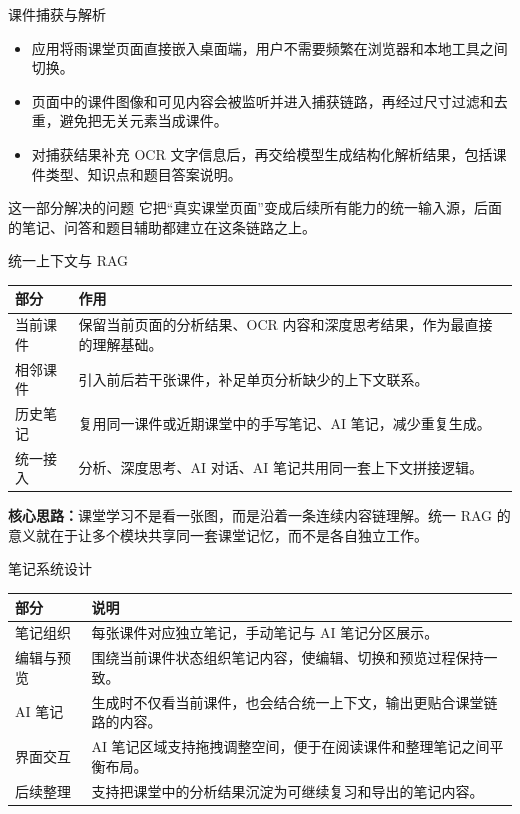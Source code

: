 \documentclass[11pt,aspectratio=169]{ctexbeamer}
\begin{document}
\begin{frame}[t]{课件捕获与解析}
\normalsize
\begin{itemize}
\item 应用将雨课堂页面直接嵌入桌面端，用户不需要频繁在浏览器和本地工具之间切换。
\item 页面中的课件图像和可见内容会被监听并进入捕获链路，再经过尺寸过滤和去重，避免把无关元素当成课件。
\item 对捕获结果补充 OCR 文字信息后，再交给模型生成结构化解析结果，包括课件类型、知识点和题目答案说明。
\end{itemize}
\vspace{0.45em}
\begin{block}{这一部分解决的问题}
它把“真实课堂页面”变成后续所有能力的统一输入源，后面的笔记、问答和题目辅助都建立在这条链路之上。
\end{block}
\end{frame}

\begin{frame}[t]{统一上下文与 RAG}
\small
\begin{tabularx}{\textwidth}{L{2.05cm} Y}
\toprule
部分 & 作用 \\
\midrule
当前课件 & 保留当前页面的分析结果、OCR 内容和深度思考结果，作为最直接的理解基础。 \\
相邻课件 & 引入前后若干张课件，补足单页分析缺少的上下文联系。 \\
历史笔记 & 复用同一课件或近期课堂中的手写笔记、AI 笔记，减少重复生成。 \\
统一接入 & 分析、深度思考、AI 对话、AI 笔记共用同一套上下文拼接逻辑。 \\
\bottomrule
\end{tabularx}
\vspace{0.55em}
\normalsize
\textbf{核心思路：}课堂学习不是看一张图，而是沿着一条连续内容链理解。统一 RAG 的意义就在于让多个模块共享同一套课堂记忆，而不是各自独立工作。
\end{frame}

\begin{frame}[t]{笔记系统设计}
\small
\begin{tabularx}{\textwidth}{L{2.1cm} Y}
\toprule
部分 & 说明 \\
\midrule
笔记组织 & 每张课件对应独立笔记，手动笔记与 AI 笔记分区展示。 \\
编辑与预览 & 围绕当前课件状态组织笔记内容，使编辑、切换和预览过程保持一致。 \\
AI 笔记 & 生成时不仅看当前课件，也会结合统一上下文，输出更贴合课堂链路的内容。 \\
界面交互 & AI 笔记区域支持拖拽调整空间，便于在阅读课件和整理笔记之间平衡布局。 \\
后续整理 & 支持把课堂中的分析结果沉淀为可继续复习和导出的笔记内容。 \\
\bottomrule
\end{tabularx}
\end{frame}
\end{document}
